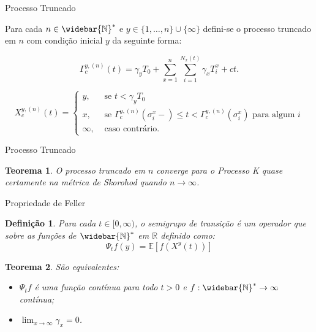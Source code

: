 \documentclass[xcolor=pdftex,dvipsnames]{beamer}
\newcommand{\Nzb}{{\mathbb{\widebar{N}^*}}}
\newcommand{\R}{{\mathbb{R}}}
\newcommand{\E}{{\mathbb{E}}}
\newtheorem{teorema}{Teorema}
\newtheorem{definicao}{Definição}
\begin{document}
\begin{frame}{Processo Truncado}

  Para cada $n \in \Nzb$  e $y \in \{ 1, \ldots, n\} \cup \{ \infty
  \}$ defini-se o processo truncado em $n$ com condição inicial $y$ da
  seguinte forma:


\begin{displaymath}
  \Gamma^{y,(n)}_c (t) = \gamma_y T_0
  + \sum_{x =1}^{n} \sum_{i = 1}^{N_x(t)}
  \gamma_x T_i^x
  + ct.
\end{displaymath}

\begin{displaymath}
   X^{y,(n)}_c(t) = \begin{cases}
    y, & \textrm{ se }  t < \gamma_y T_0 \\
    x, & \textrm{ se } \Gamma^{y,(n)}_c(\sigma_i^x-) \leq t <
    \Gamma^{y,(n)}_c(\sigma^x_i)
    \text{ para algum } i \\
    \infty, & \textrm{ caso contrário.}
  \end{cases}
\end{displaymath}
\end{frame}


\begin{frame}{Processo Truncado}
  \begin{teorema}
    O processo truncado em $n$ converge para o Processo K quase
    certamente na métrica de Skorohod quando $n \to \infty$.
  \end{teorema}
\end{frame}


\begin{frame}{Propriedade de Feller}

  \begin{definicao}
    Para cada $t \in [0, \infty)$, o semigrupo de transição é um
    operador que sobre as funções de $\Nzb$ em $\R$ definido como:
    \begin{displaymath}
      \Psi_t f (y) = \E \left[ f(X^y(t)) \right]
    \end{displaymath}
  \end{definicao} \pause

  \begin{teorema}
    São equivalentes:
    \begin{itemize}
    \item $\Psi_t f$ é uma função contínua para todo $t > 0$ e $f:
      \Nzb \to \infty$ contínua;
    \item $\displaystyle \lim_{x \to \infty} \gamma_x = 0$.
    \end{itemize}
  \end{teorema}
\end{frame}
\end{document}
